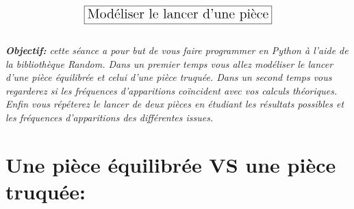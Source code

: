 \documentclass[11pt,a4paper]{book}
\begin{document}
	\lhead{}\chead{}\rhead{}\renewcommand{\headrulewidth}{0pt}\renewcommand{\footrulewidth}{0.4pt}
	\hfill\\[-1cm]
	$$\fbox{\text{\Large{Modéliser le lancer d'une pièce}}}$$
	\hfil\\
	\textit{\textbf{Objectif:} cette séance a pour but de vous faire programmer en \emph{Python} à l'aide de la bibliothèque \emph{Random}. Dans un premier temps vous allez modéliser le lancer d'une pièce équilibrée et celui d'une pièce truquée. Dans un second temps vous regarderez si les fréquences d'apparitions coïncident avec vos calculs théoriques. Enfin vous répéterez le lancer de deux pièces en étudiant les résultats possibles et les fréquences d'apparitions des différentes issues.   }
	\section{Une pièce équilibrée VS une pièce truquée:}
\end{document}
